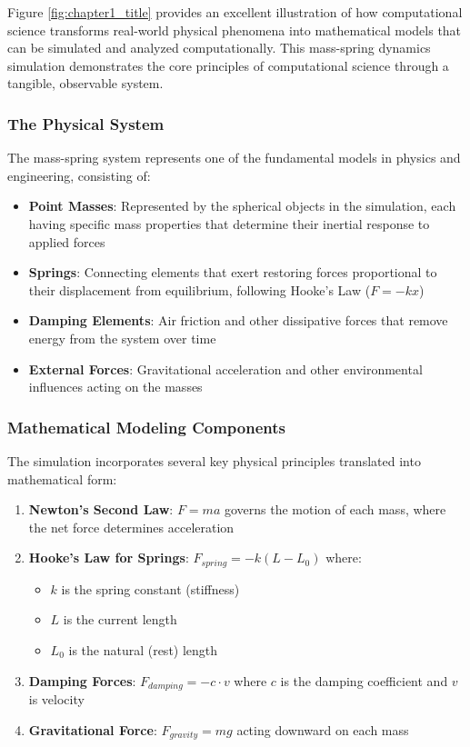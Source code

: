 Figure \ref{fig:chapter1_title} provides an excellent illustration of how computational science transforms real-world physical phenomena into mathematical models that can be simulated and analyzed computationally. This mass-spring dynamics simulation demonstrates the core principles of computational science through a tangible, observable system.

\subsubsection{The Physical System}

The mass-spring system represents one of the fundamental models in physics and engineering, consisting of:

\begin{itemize}
  \item \textbf{Point Masses}: Represented by the spherical objects in the simulation, each having specific mass properties that determine their inertial response to applied forces
  \item \textbf{Springs}: Connecting elements that exert restoring forces proportional to their displacement from equilibrium, following Hooke's Law ($F = -kx$)
  \item \textbf{Damping Elements}: Air friction and other dissipative forces that remove energy from the system over time
  \item \textbf{External Forces}: Gravitational acceleration and other environmental influences acting on the masses
\end{itemize}

\subsubsection{Mathematical Modeling Components}

The simulation incorporates several key physical principles translated into mathematical form:

\begin{enumerate}
  \item \textbf{Newton's Second Law}: $F = ma$ governs the motion of each mass, where the net force determines acceleration
      
  \item \textbf{Hooke's Law for Springs}: $F_{spring} = -k(L - L_0)$ where:
  \begin{itemize}
    \item $k$ is the spring constant (stiffness)
    \item $L$ is the current length
    \item $L_0$ is the natural (rest) length
  \end{itemize}
      
  \item \textbf{Damping Forces}: $F_{damping} = -c \cdot v$ where $c$ is the damping coefficient and $v$ is velocity
      
  \item \textbf{Gravitational Force}: $F_{gravity} = mg$ acting downward on each mass
\end{enumerate}

